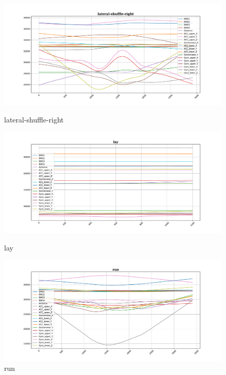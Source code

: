 \begin{figure}[!tbp]
	\begin{minipage}[b]{0.31\textwidth}
		\includegraphics[width=\textwidth]{images/lateral-shuffle-right_example.pdf}
		\caption{lateral-shuffle-right}
	\end{minipage}
	\begin{minipage}[b]{0.31\textwidth}
		\includegraphics[width=\textwidth]{images/lay_example.pdf}
		\caption{lay}
	\end{minipage}
	\begin{minipage}[b]{0.31\textwidth}
		\includegraphics[width=\textwidth]{images/run_example.pdf}
		\caption{run}
	\end{minipage}
\end{figure}




